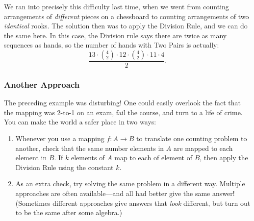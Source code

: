 We ran into precisely this difficulty last time, when we went from
counting arrangements of \emph{different} pieces on a chessboard to
counting arrangements of two \emph{identical} rooks.  The solution
then was to apply the Division Rule, and we can do the same here.  In
this case, the Division rule says there are twice as many sequences
as hands, so the number of hands with Two Pairs is actually:
%
\[
\frac{13 \cdot \binom{4}{2} \cdot 12 \cdot \binom{4}{2} \cdot 11 \cdot 4}{2}.
\]

\subsubsection*{Another Approach}

The preceding example was disturbing!  One could easily overlook the
fact that the mapping was 2-to-1 on an exam, fail the course, and turn
to a life of crime.  You can make the world a safer place in two ways:

\begin{enumerate}

\item Whenever you use a mapping $f : A \to B$ to translate one counting
  problem to another, check that the same number elements in $A$ are
  mapped to each element in $B$.  If $k$ elements of $A$ map to each of
  element of $B$, then apply the Division Rule using the constant $k$.

\item As an extra check, try solving the same problem in a different
way.  Multiple approaches are often available---and all had better
give the same answer!  (Sometimes different approaches give answers
that \emph{look} different, but turn out to be the same after some
algebra.)

\end{enumerate}


